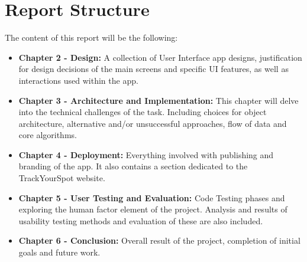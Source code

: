 \section{Report Structure}
The content of this report will be the following:
\begin{itemize}
    \item \textbf{Chapter 2 - Design: } A collection of User Interface app designs, justification for design decisions of the main screens and specific UI features, as well as interactions used within the app.
    \item \textbf{Chapter 3 - Architecture and Implementation: }This chapter will delve into the technical challenges of the task. Including choices for object architecture, alternative and/or unsuccessful approaches, flow of data and core algorithms.
    \item \textbf{Chapter 4 - Deployment: }Everything involved with publishing and branding of the app. It also contains a section dedicated to the TrackYourSpot website.
    \item \textbf{Chapter 5 - User Testing and Evaluation: } Code Testing phases and exploring the human factor element of the project. Analysis and results of usability testing methods and evaluation of these are also included.
    \item \textbf{Chapter 6 - Conclusion: }Overall result of the project, completion of initial goals and future work.
\end{itemize}